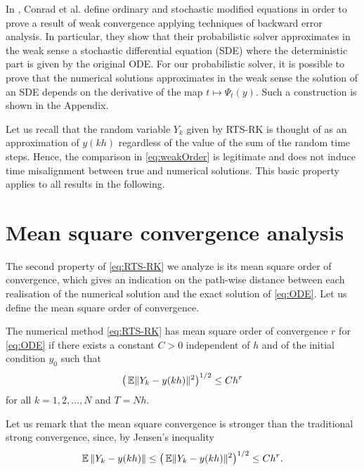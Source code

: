\documentclass[10pt]{article}
\begin{document}
\begin{remark}\label{rem:sde} In \cite{CGS17}, Conrad et al. define ordinary and stochastic modified equations in order to prove a result of weak convergence applying techniques of backward error analysis. In particular, they show that their probabilistic solver approximates in the weak sense a stochastic differential equation (SDE) where the deterministic part is given by the original ODE. For our probabilistic solver, it is possible to prove that the numerical solutions approximates in the weak sense the solution of an SDE  depends on the derivative of the map $t \mapsto \Psi_t(y)$. Such a construction is shown in the Appendix.
\end{remark}

\begin{remark} Let us recall that the random variable $Y_k$ given by RTS-RK is thought of as an approximation of $y(kh)$ regardless of the value of the sum of the random time steps. Hence, the comparison in \eqref{eq:weakOrder} is legitimate and does not induce time misalignment between true and numerical solutions. This basic property applies to all results in the following.
\end{remark}

\section{Mean square convergence analysis}\label{sec:StrongOrder}

The second property of \eqref{eq:RTS-RK} we analyze is its mean square order of convergence, which gives an indication on the path-wise distance between each realisation of the numerical solution and the exact solution of \eqref{eq:ODE}. Let us define the mean square order of convergence. 
\begin{definition} The numerical method \eqref{eq:RTS-RK} has mean square order of convergence $r$ for \eqref{eq:ODE} if there exists a constant $C > 0$ independent of $h$ and of the initial condition $y_0$ such that
	\begin{equation}
	\big(\operatorname{\mathbb{E}}\lVert Y_k - y(kh)\rVert^2\big)^{1/2} \leq Ch^r
	\end{equation}
	for all $k = 1, 2, \ldots, N$ and $T = Nh$.
\end{definition} 
\begin{remark} Let us remark that the mean square convergence is stronger than the traditional strong convergence, since, by Jensen's inequality 
	\begin{equation}
		\operatorname{\mathbb{E}}{\lVert Y_k - y(kh)\rVert} \leq \big(\operatorname{\mathbb{E}}\lVert Y_k - y(kh)\rVert^2\big)^{1/2} \leq Ch^r.
	\end{equation}	
\end{remark}
\end{document}
